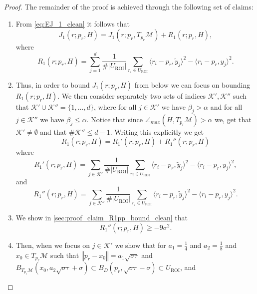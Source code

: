 \documentclass[12pt]{article}
\theoremstyle{remark}
\newcommand{\MM}{\mathcal{M}}
\newcommand{\KK}{\mathcal{K}}
\newcommand{\norm}[1]{\left\Vert #1 \right\Vert}
\begin{document}
\begin{proof}
The remainder of the proof is achieved through the following set of claims:
\begin{enumerate}
    \item\label{thm:claim_J1H_clean} From \eqref{eq:EJ_1_clean} it follows that
    \[J_1(r; {p_r}, H) =  J_1(r;{p_r},T_{p_r}\MM) +  R_1(r;{p_r},H),\]
    where
    \begin{equation}\label{eq:sum_k_clean}
    R_1(r; {p_r}, H) = \sum\limits_{j=1}^{d} \frac{1}{\#|U_\textrm{ROI}|}\sum\limits_{r_i\in U_\textrm{ROI}}  \langle r_i - {p_r}, \tilde{y}_j \rangle^2 - \langle r_i - {p_r}, {y}_j \rangle^2
    .\end{equation}
    \item Thus, in order to bound $J_1(r; {p_r}, H)$ from below we can focus on bounding $R_1(r; {p_r}, H)$.
    We then consider separately two sets of indices $\KK', \KK''$ such that $\KK' \cup \KK'' = \{1,\ldots, d\}$, where for all $j\in \KK'$ we have $\beta_j > \alpha$ and for all $j\in \KK''$ we have $\beta_j\leq \alpha$.
    Notice that since $\angle_{max}(H, T_{p_r}\MM) > \alpha$ we, get that $\KK' \not = \emptyset$ and that $\#\KK'' \leq d-1$.
    Writing this explicitly we get
    \begin{equation}\label{eq:RpRpp_clean}
        R_1(r; {p_r}, H) = R_1'(r; {p_r}, H)  +  R_1''(r; {p_r}, H)
    \end{equation}
    where 
    \begin{equation}\label{eq:R1p_def_clean}
    R_1'(r; {p_r}, H) = \sum\limits_{j\in\KK'} \frac{1}{\#|U_\textrm{ROI}|}\sum\limits_{r_i\in U_\textrm{ROI}}  \langle r_i - {p_r}, \tilde{y}_j \rangle^2 - \langle r_i - {p_r}, {y}_j \rangle^2
    ,\end{equation}
    and
    \begin{equation}\label{eq:R1pp_def_clean}
    R_1''(r; {p_r}, H) = \sum\limits_{j\in\KK''} \frac{1}{\#|U_\textrm{ROI}|}\sum\limits_{r_i\in U_\textrm{ROI}}  \langle r_i - {p_r}, \tilde{y}_j \rangle^2 - \langle r_i - {p_r}, {y}_j \rangle^2
    .\end{equation}
    \item\label{thm:claim_R1pp_bound_clean} We show in \ref{sec:proof_claim_R1pp_bound_clean} that
    \begin{equation}\label{eq:R1pp_bound_clean}
    R_1''(r; {p_r}, H) \geq
    -9 \sigma^2
    .\end{equation}
    \item\label{thm:claim_ri_tyk_bound_clean} Then, when we focus on $j\in\KK'$ we show that for $a_1 = \frac{1}{4}$ and $a_2 = \frac{1}{8}$ and $x_0\in T_{p_r}\MM$ such that $\norm{{p_r} - x_0} = a_1\sqrt{\sigma\tau}$ and $B_{T_{p_r}\MM}(x_0, a_2 \sqrt{\sigma\tau} + \sigma)\subset B_D({p_r}, \sqrt{\sigma \tau} - \sigma) \subset U_\textrm{ROI}$, and 

\end{enumerate}
\end{proof}
\end{document}
